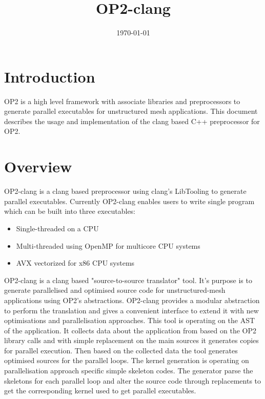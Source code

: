 \documentclass{article}
\title{OP2-clang}
\date{\today}
\begin{document}
\maketitle

\newcommand{\optarget}{\textbf{OPTarget} }
\newcommand{\opRefToolHpp}{\textbf{OP2RefactoringTool.hpp} }
\newcommand{\opRefToolHppN}{\textbf{OP2RefactoringTool.hpp}}
\newcommand{\omp}{OpenMP }
\newcommand{\ompN}{OpenMP}
\tableofcontents

\section{Introduction}

OP2 is a high level framework with associate libraries and preprocessors to generate parallel executables for unstructured mesh applications. This document describes the usage and implementation of the clang based C++ preprocessor for OP2.



\section{Overview}
OP2-clang is a clang based preprocessor using clang's LibTooling to generate parallel executables. 
Currently OP2-clang enables users to write single program which can be built into three executables:
\begin{itemize}
    \item Single-threaded on a CPU
    \item Multi-threaded using \omp for multicore CPU systems
    \item AVX vectorized for x86 CPU systems
\end{itemize}

OP2-clang is a clang based "source-to-source translator" tool. It's purpose is to generate parallelised and optimised source code for unstructured-mesh applications using OP2's abstractions. OP2-clang provides a modular abstraction to perform the translation and gives a convenient interface to extend it with new optimisations and parallelisation approaches.
This tool is operating on the AST of the application. It collects data about the application from based on the OP2 library calls and with simple replacement on the main sources it generates copies for parallel execution. Then based on the collected data the tool generates optimised sources for the parallel loops. The kernel generation is operating on parallelisation approach specific simple skeleton codes. The generator parse the skeletons for each parallel loop and alter the source code through replacements to get the corresponding kernel used to get parallel executables.
\end{document}
